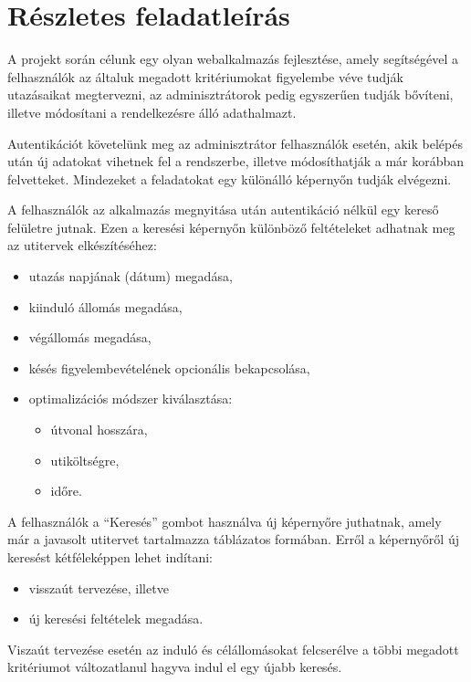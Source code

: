 \section*{Részletes feladatleírás} %
A projekt során célunk egy olyan webalkalmazás fejlesztése, amely segítségével
a felhasználók az általuk megadott kritériumokat figyelembe véve tudják
utazásaikat megtervezni, az adminisztrátorok pedig egyszerűen tudják bővíteni,
illetve módosítani a rendelkezésre álló adathalmazt.

Autentikációt követelünk meg az adminisztrátor felhasználók esetén, akik
belépés után új adatokat vihetnek fel a rendszerbe, illetve módosíthatják a már
korábban felvetteket. Mindezeket a feladatokat egy különálló képernyőn tudják
elvégezni.

A felhasználók az alkalmazás megnyitása után autentikáció nélkül egy kereső
felületre jutnak. Ezen a keresési képernyőn különböző feltételeket adhatnak meg
az utitervek elkészítéséhez:
\begin{itemize}
  \item utazás napjának (dátum) megadása,
  \item kiinduló állomás megadása,
  \item végállomás megadása,
  \item késés figyelembevételének opcionális bekapcsolása,
  \item optimalizációs módszer kiválasztása:
  \begin{itemize}
    \item útvonal hosszára,
    \item utiköltségre,
    \item időre.
  \end{itemize}
\end{itemize}

A felhasználók a ``Keresés'' gombot használva új képernyőre juthatnak, amely már
a javasolt utitervet tartalmazza táblázatos formában. Erről a képernyőről új
keresést kétféleképpen lehet indítani:
\begin{itemize}
  \item visszaút tervezése, illetve
  \item új keresési feltételek megadása.
\end{itemize}
Viszaút tervezése esetén az induló és célállomásokat felcserélve a többi
megadott kritériumot változatlanul hagyva indul el egy újabb keresés.

